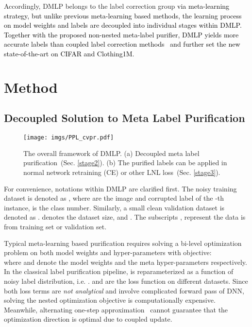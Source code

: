 \documentclass[10pt,twocolumn,letterpaper]{article}
\newcommand{\zbs}[1]{\textcolor{black}{#1}}
\begin{document}
Accordingly, DMLP belongs to the label correction group \zbs{via meta-learning strategy, but unlike previous meta-learning based methods, the learning process on model weights and labels are decoupled into individual stages within DMLP. Together with the proposed non-nested meta-label purifier, DMLP yields more accurate labels than coupled label correction methods~\cite{AAAI-2021-meta,zheng2021meta} and further set the new state-of-the-art on CIFAR and Clothing1M.}






\section{Method} \label{Method}
\subsection{Decoupled Solution to Meta Label Purification}
\begin{figure*}[!t]
\centering
\texttt{[image: imgs/PPL\_cvpr.pdf]}
\vspace{-3mm}
\caption{The overall framework of DMLP. (a) Decoupled meta label purification~(Sec. \ref{stage2}). (b) The purified labels can be applied in normal network retraining (CE) or other LNL loss~(Sec. \ref{stage3}).}\vspace{-3.5mm}
\label{fig:framework}
\end{figure*}


For convenience, notations within DMLP are clarified first. The noisy training dataset is denoted as , where  are the image and corrupted label of the -th instance,  is the class number. Similarly, a small clean validation dataset is denoted as .  denotes the dataset size, {and }. The subscripts ,  represent the data is from training set or validation set. 

{Typical meta-learning based purification requires solving a bi-level optimization problem on both model weights and hyper-parameters with objective:}
 \\
where  and  denote the model weights and the {meta hyper-parameters} respectively. {In the classical label purification pipeline,  is reparameterized as a function of noisy label distribution, i.e. }.  and  are the loss function on different datasets. 
{Since both loss terms are \emph{not analytical} and involve complicated forward pass of DNN, solving the nested optimization objective is computationally expensive. Meanwhile, alternating one-step approximation~\cite{Learning-to-Reweight,AAAI-2021-meta} cannot guarantee that the optimization direction is optimal due to coupled update.}
\end{document}
